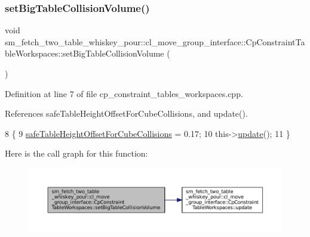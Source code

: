 \subsubsection{\texorpdfstring{set\+Big\+Table\+Collision\+Volume()}{setBigTableCollisionVolume()}}
{\footnotesize\ttfamily void sm\+\_\+fetch\+\_\+two\+\_\+table\+\_\+whiskey\+\_\+pour\+::cl\+\_\+move\+\_\+group\+\_\+interface\+::\+Cp\+Constraint\+Table\+Workspaces\+::set\+Big\+Table\+Collision\+Volume (\begin{DoxyParamCaption}{ }\end{DoxyParamCaption})}



Definition at line 7 of file cp\+\_\+constraint\+\_\+tables\+\_\+workspaces.\+cpp.



References safe\+Table\+Height\+Offset\+For\+Cube\+Collisions, and update().


\begin{DoxyCode}
8         \{
9             \hyperlink{classsm__fetch__two__table__whiskey__pour_1_1cl__move__group__interface_1_1CpConstraintTableWorkspaces_a16a18c331ca1476ec1fb021dc0c0be97}{safeTableHeightOffsetForCubeCollisions} = 0.17;
10             this->\hyperlink{classsm__fetch__two__table__whiskey__pour_1_1cl__move__group__interface_1_1CpConstraintTableWorkspaces_a7c8e7186aff561f2a1721145814add82}{update}();
11         \}
\end{DoxyCode}
Here is the call graph for this function\+:
\nopagebreak
\begin{figure}[H]
\begin{center}
\leavevmode
\includegraphics[width=350pt]{classsm__fetch__two__table__whiskey__pour_1_1cl__move__group__interface_1_1CpConstraintTableWorkspaces_afddc692582062ce054c0ba834ae76d0a_cgraph}
\end{center}
\end{figure}
\mbox{\label{classsm__fetch__two__table__whiskey__pour_1_1cl__move__group__interface_1_1CpConstraintTableWorkspaces_aec8ff8ff7f564986dc02cc019c67a233}} 
